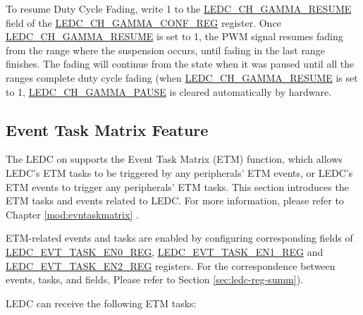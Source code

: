 \documentclass[main\_\_EN.tex]{subfiles}
\begin{document}
To resume Duty Cycle Fading, write 1 to the  \hyperref[fielddesc:LEDCCHNGAMMARESUME]{LEDC\_CH\_GAMMA\_RESUME} field of the \hyperref[regdesc:LEDCCHNGAMMACONFREG]{LEDC\_CH\_GAMMA\_CONF\_REG} register. Once \hyperref[fielddesc:LEDCCHNGAMMARESUME]{LEDC\_CH\_GAMMA\_RESUME} is set to 1, the PWM signal resumes fading from the range where the suspension occurs, until fading in the last range finishes. The fading will continue from the state when it was paused until all the ranges complete duty cycle fading (when \hyperref[fielddesc:LEDCCHNGAMMARESUME]{LEDC\_CH\_GAMMA\_RESUME} is set to 1, \hyperref[fielddesc:LEDCCHNGAMMAPAUSE]{LEDC\_CH\_GAMMA\_PAUSE} is cleared automatically by hardware.

\subsection{Event Task Matrix Feature}

The LEDC on \chipname{} supports the Event Task Matrix (ETM) function, which allows LEDC's ETM tasks to be triggered by any peripherals' ETM events, or LEDC's ETM events to trigger any peripherals' ETM tasks. This section introduces the ETM tasks and events related to LEDC. For more information, please refer to Chapter \ref{mod:evntaskmatrix} .

ETM-related events and tasks are enabled by configuring corresponding fields of  \hyperref[regdesc:LEDCEVTTASKEN0REG]{LEDC\_EVT\_TASK\_EN0\_REG}, \hyperref[regdesc:LEDCEVTTASKEN1REG]{LEDC\_EVT\_TASK\_EN1\_REG} and \hyperref[regdesc:LEDCEVTTASKEN2REG]{LEDC\_EVT\_TASK\_EN2\_REG} registers. For the correspondence between events, tasks, and fields, Please refer to Section \ref{sec:ledc-reg-summ}).

LEDC can receive the following ETM tasks:
\end{document}
